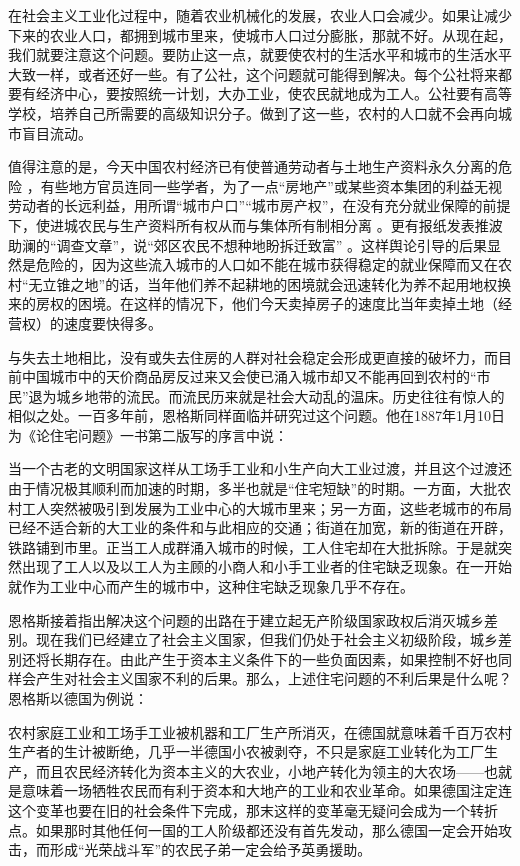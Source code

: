 \documentclass[UTF8, 12pt, a4paper]{ctexrep}
\begin{document}
在社会主义工业化过程中，随着农业机械化的发展，农业人口会减少。如果让减少下来的农业人口，都拥到城市里来，使城市人口过分膨胀，那就不好。从现在起，我们就要注意这个问题。要防止这一点，就要使农村的生活水平和城市的生活水平大致一样，或者还好一些。有了公社，这个问题就可能得到解决。每个公社将来都要有经济中心，要按照统一计划，大办工业，使农民就地成为工人。公社要有高等学校，培养自己所需要的高级知识分子。做到了这一些，农村的人口就不会再向城市盲目流动。

值得注意的是，今天中国农村经济已有使普通劳动者与土地生产资料永久分离的危险 ，有些地方官员连同一些学者，为了一点“房地产”或某些资本集团的利益无视劳动者的长远利益，用所谓“城市户口”“城市房产权”，在没有充分就业保障的前提下，使进城农民与生产资料所有权从而与集体所有制相分离 。更有报纸发表推波助澜的“调查文章”，说“郊区农民不想种地盼拆迁致富” 。这样舆论引导的后果显然是危险的，因为这些流入城市的人口如不能在城市获得稳定的就业保障而又在农村“无立锥之地”的话，当年他们养不起耕地的困境就会迅速转化为养不起用地权换来的房权的困境。在这样的情况下，他们今天卖掉房子的速度比当年卖掉土地（经营权）的速度要快得多。

与失去土地相比，没有或失去住房的人群对社会稳定会形成更直接的破坏力，而目前中国城市中的天价商品房反过来又会使已涌入城市却又不能再回到农村的“市民”退为城乡地带的流民。而流民历来就是社会大动乱的温床。历史往往有惊人的相似之处。一百多年前，恩格斯同样面临并研究过这个问题。他在1887年1月10日为《论住宅问题》一书第二版写的序言中说：

当一个古老的文明国家这样从工场手工业和小生产向大工业过渡，并且这个过渡还由于情况极其顺利而加速的时期，多半也就是“住宅短缺”的时期。一方面，大批农村工人突然被吸引到发展为工业中心的大城市里来；另一方面，这些老城市的布局已经不适合新的大工业的条件和与此相应的交通；街道在加宽，新的街道在开辟，铁路铺到市里。正当工人成群涌入城市的时候，工人住宅却在大批拆除。于是就突然出现了工人以及以工人为主顾的小商人和小手工业者的住宅缺乏现象。在一开始就作为工业中心而产生的城市中，这种住宅缺乏现象几乎不存在。

恩格斯接着指出解决这个问题的出路在于建立起无产阶级国家政权后消灭城乡差别。现在我们已经建立了社会主义国家，但我们仍处于社会主义初级阶段，城乡差别还将长期存在。由此产生于资本主义条件下的一些负面因素，如果控制不好也同样会产生对社会主义国家不利的后果。那么，上述住宅问题的不利后果是什么呢？恩格斯以德国为例说：

农村家庭工业和工场手工业被机器和工厂生产所消灭，在德国就意味着千百万农村生产者的生计被断绝，几乎一半德国小农被剥夺，不只是家庭工业转化为工厂生产，而且农民经济转化为资本主义的大农业，小地产转化为领主的大农场——也就是意味着一场牺牲农民而有利于资本和大地产的工业和农业革命。如果德国注定连这个变革也要在旧的社会条件下完成，那末这样的变革毫无疑问会成为一个转折点。如果那时其他任何一国的工人阶级都还没有首先发动，那么德国一定会开始攻击，而形成“光荣战斗军”的农民子弟一定会给予英勇援助。
\end{document}
